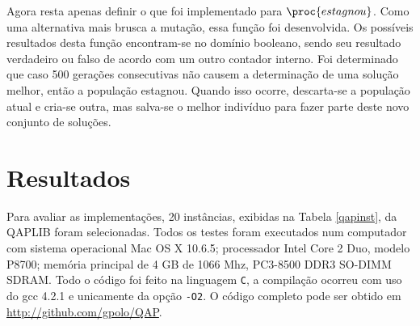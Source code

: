 Agora resta apenas definir o que foi implementado para
$\proc{estagnou}$. Como uma alternativa mais brusca a mutação, essa
função foi desenvolvida. Os possíveis resultados desta função
encontram-se no domínio booleano, sendo seu resultado verdadeiro ou
falso de acordo com um outro contador interno. Foi determinado que
caso 500 gerações consecutivas não causem a determinação de uma
solução melhor, então a população estagnou. Quando isso ocorre,
descarta-se a população atual e cria-se outra, mas salva-se o
melhor indivíduo para fazer parte deste novo conjunto de soluções.

\section{Resultados}

Para avaliar as implementações, 20 instâncias, exibidas na Tabela
\ref{qapinst}, da QAPLIB \cite{qaplib} foram selecionadas. Todos os
testes foram executados num computador com sistema operacional Mac OS
X 10.6.5; processador Intel Core 2 Duo, modelo P8700; memória
principal de 4 GB de 1066 Mhz, PC3-8500 DDR3 SO-DIMM SDRAM. Todo o
código foi feito na linguagem \texttt{C}, a compilação ocorreu com uso
do gcc 4.2.1 e unicamente da opção \verb!-O2!. O código completo pode
ser obtido em \url{http://github.com/gpolo/QAP}.

